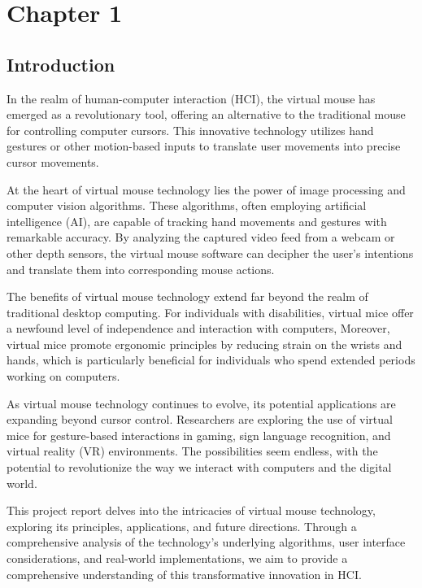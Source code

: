 \documentclass[12pt,a4paper]{report}
\begin{document}
		\tableofcontents

	
	\renewcommand{\thesection}{\arabic{section}}
	\newpage
	{\vfill \chapter*{\centering \vfill Chapter 1 \vfill}\vfill}
	\thispagestyle{empty}
	\newpage

	\label{Introduction}
	\section{Introduction}
		{In the realm of human-computer interaction (HCI), the virtual mouse has emerged as a revolutionary tool, offering an alternative to the traditional mouse for controlling computer cursors. This innovative technology utilizes hand gestures or other motion-based inputs to translate user movements into precise cursor movements. \cite{r1}

 

At the heart of virtual mouse technology lies the power of image processing and computer vision algorithms. These algorithms, often employing artificial intelligence (AI), are capable of tracking hand movements and gestures with remarkable accuracy. By analyzing the captured video feed from a webcam or other depth sensors, the virtual mouse software can decipher the user's intentions and translate them into corresponding mouse actions.\cite{r3} 

 

The benefits of virtual mouse technology extend far beyond the realm of traditional desktop computing. For individuals with disabilities, virtual mice offer a newfound level of independence and interaction with computers, Moreover, virtual mice promote ergonomic principles by reducing strain on the wrists and hands, which is particularly beneficial for individuals who spend extended periods working on computers. 

As virtual mouse technology continues to evolve, its potential applications are expanding beyond cursor control. Researchers are exploring the use of virtual mice for gesture-based interactions in gaming, sign language recognition, and virtual reality (VR) environments.\cite{r7} The possibilities seem endless, with the potential to revolutionize the way we interact with computers and the digital world. 

 

This project report delves into the intricacies of virtual mouse technology, exploring its principles, applications, and future directions. Through a comprehensive analysis of the technology's underlying algorithms, user interface considerations, and real-world implementations, we aim to provide a comprehensive understanding of this transformative innovation in HCI. }
	\label{Problem Statement}
\end{document}
